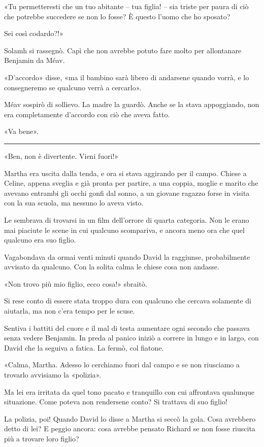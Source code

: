 «Tu permetteresti che un tuo abitante -- tua figlia! -- sia triste per paura di ciò che potrebbe
succedere se non lo fosse? È questo l'uomo che ho sposato?

Sei così codardo?!»

Solamh si rassegnò. Capì che non avrebbe potuto fare molto per allontanare Benjamin da Méav.

«D'accordo» disse, «ma il bambino sarà libero di andarsene quando vorrà, e lo consegneremo se
qualcuno verrà a cercarlo».

Méav sospirò di sollievo. La madre la guardò. Anche se la stava appoggiando, non era completamente
d'accordo con ciò che aveva fatto.

«Va bene».

\plainbreak{1}

«Ben, non è divertente. Vieni fuori!»

Martha era uscita dalla tenda, e ora si stava aggirando per il campo. Chiese a Celine, appena
sveglia e già pronta per partire, a una coppia, moglie e marito che avevano entrambi gli occhi gonfi
dal sonno, a un giovane ragazzo forse in visita con la sua scuola, ma nessuno lo aveva visto.

Le sembrava di trovarsi in un film dell'orrore di quarta categoria. Non le erano mai piaciute le
scene in cui qualcuno scompariva, e ancora meno ora che quel qualcuno era suo figlio.

Vagabondava da ormai venti minuti quando David la raggiunse, probabilmente avvisato da qualcuno. Con
la solita calma le chiese cosa non andasse.

«Non trovo più mio figlio, ecco cosa!» sbraitò.

Si rese conto di essere stata troppo dura con qualcuno che cercava solamente di aiutarla, ma non
c'era tempo per le scuse.

Sentiva i battiti del cuore e il mal di testa aumentare ogni secondo che passava senza vedere
Benjamin. In preda al panico iniziò a correre in lungo e in largo, con David che la seguiva a
fatica. La fermò, col fiatone.

«Calma, Martha. Adesso lo cerchiamo fuori dal campo e se non riusciamo a trovarlo avvisiamo la
«polizia».

Ma lei era irritata da quel tono pacato e tranquillo con cui affrontava qualunque situazione. Come
poteva non rendersene conto? Si trattava di suo figlio!

La polizia, poi! Quando David lo disse a Martha si seccò la gola. Cosa avrebbero detto di lei? E
peggio ancora: cosa avrebbe pensato Richard se non fosse riuscita più a trovare loro figlio?

